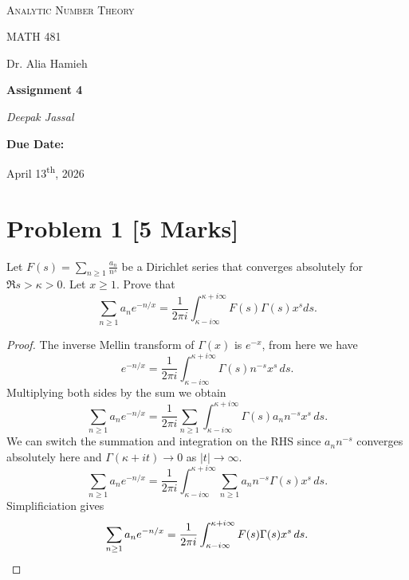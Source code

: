 \documentclass[12pt]{article}
\renewcommand{\author}{Deepak Jassal}
\renewcommand{\coursename}{Analytic Number Theory}
\renewcommand{\coursecode}{MATH 481}
\renewcommand{\assignment}{Assignment 4}
\renewcommand{\instructor}{Dr. Alia Hamieh}
\renewcommand{\duedate}{April 13\textsuperscript{th}, 2026}
\begin{document}
\begin{titlepage}
	\centering
	\vspace*{2.0cm}	
	\\
	{\LARGE \textsc{\coursename}\par}
	\vspace{0.5cm}
	{\large\coursecode\par}
    \vspace{0.5cm}
    {\large\instructor\par}
	\vspace{1.5cm}
	{\huge\bfseries\assignment\par}
	\vspace{1cm}  
	{\LARGE\itshape\author\par}
    \vspace{2cm}
	{\large\bfseries Due Date:\par}
	\vspace{0.5cm}
	{\Large \duedate}\\
\end{titlepage}
\section*{Problem 1 [5 Marks]}
Let $F(s)=\sum_{n\ge 1} \frac{a_n}{n^s}$ be a Dirichlet series that converges absolutely for $\Re s>\kappa>0$. Let $x\ge 1$. Prove that
\[
    \sum_{n\ge 1} a_n e^{-n/x} = \frac1{2\pi i} \int_{\kappa-i\infty}^{\kappa+i\infty} F(s) \Gamma(s) x^s ds.
\]
\begin{proof}
    The inverse Mellin transform of $\Gamma(x)$ is $e^{-x}$, from here we have
    \[
        e^{-n/x}=\frac{1}{2\pi i}\int_{\kappa-i\infty}^{\kappa+i\infty}\Gamma(s)n^{-s}x^s\,ds.
    \]
    Multiplying both sides by the sum we obtain
    \[
        \sum_{n\ge 1} a_ne^{-n/x}=\frac{1}{2\pi i}\sum_{n\ge 1} \int_{\kappa-i\infty}^{\kappa+i\infty}\Gamma(s)a_nn^{-s}x^s\,ds.
    \]    
    We can switch the summation and integration on the RHS since $a_nn^{-s}$ converges absolutely here and $\Gamma(\kappa+it)\to0$ as $|t|\to\infty$. 
    \[
        \sum_{n\ge 1} a_ne^{-n/x}=\frac{1}{2\pi i} \int_{\kappa-i\infty}^{\kappa+i\infty}\sum_{n\ge 1}a_nn^{-s}\Gamma(s)x^s\,ds.
    \]
    Simplificiation gives     
    \[
        \sum_{n\ge 1} a_ne^{-n/x}=\frac{1}{2\pi i} \int_{\kappa-i\infty}^{\kappa+i\infty}F(s)\Gamma(s)x^s\,ds.\qedhere
    \] 
\end{proof}
\end{document}

